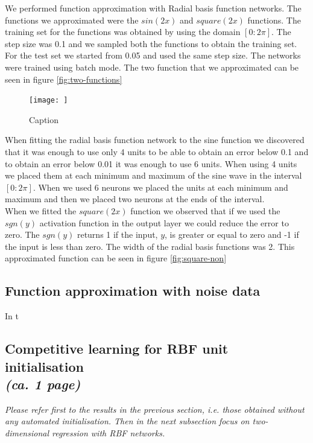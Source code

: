 \documentclass[a4paper]{article}
\begin{document}
We performed function approximation with Radial basis function networks. The functions we approximated were the $sin(2x)$ and $square(2x)$ functions. The training set for the functions was obtained by using the domain $[0:2\pi]$. The step size was 0.1 and we sampled both the functions to obtain the training set. For the test set we started from 0.05 and used the same step size. The networks were trained using batch mode. The two function that we approximated can be seen in figure \ref{fig:two-functions}\\

\begin{figure}
    \centering
    \texttt{[image: ]}
    \caption{Caption}
    \label{fig:enter-label}
\end{figure}

When fitting the radial basis function network to the sine function we discovered that it was enough to use only 4 units to be able to obtain an error below 0.1 and to obtain an error below 0.01 it was enough to use 6 units. When using 4 units we placed them at each minimum and maximum of the sine wave in the interval $[0:2\pi]$. When we used 6 neurons we placed the units at each minimum and maximum and then we placed two neurons at the ends of the interval. \\

When we fitted the $square(2x)$ function we observed that if we used the $sgn(y)$ activation function in the output layer we could reduce the error to zero. The $sgn(y)$ returns 1 if the input, $y$, is greater or equal to zero and -1 if the input is less than zero. The width of the radial basis functions was 2. This approximated function can be seen in figure \ref{fig:square-non} 



\subsection{Function approximation with noise data}
In t

\subsection{Competitive learning for RBF unit initialisation\\ \normalsize{\textit{(ca. 1 page)}}}
\textit{Please refer first to the results in the previous section, i.e. those obtained without any automated initialisation. Then in the next subsection focus on two-dimensional regression with RBF networks.}
\end{document}
